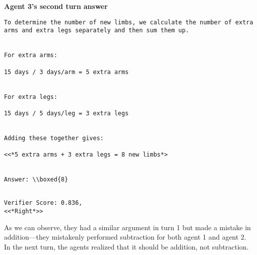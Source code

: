 \textbf{Agent 3's second turn answer} 
\begin{lstlisting}
To determine the number of new limbs, we calculate the number of extra arms and extra legs separately and then sum them up.


For extra arms:

15 days / 3 days/arm = 5 extra arms


For extra legs:

15 days / 5 days/leg = 3 extra legs


Adding these together gives:

<<*5 extra arms + 3 extra legs = 8 new limbs*>


Answer: \\boxed{8}


\end{lstlisting}
\begin{lstlisting}
Verifier Score: 0.836,
<<*Right*>> 
\end{lstlisting}


As we can observe, they had a similar argument in turn 1 but made a mistake in addition—they mistakenly performed subtraction for both agent 1 and agent 2. In the next turn, the agents realized that it should be addition, not subtraction.

